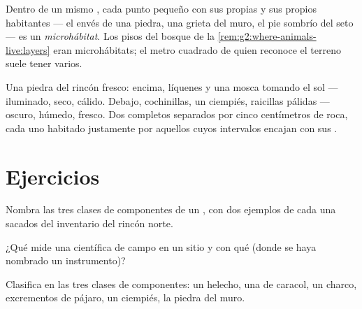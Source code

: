 \begin{definition}[Microhábitat]\label{def:g6:exploring-our-environment:microhabitat}
Dentro de un mismo , cada punto pequeño con sus propias
 y sus propios habitantes --- el envés de una piedra, una
grieta del muro, el pie sombrío del seto --- es un
\emph{microhábitat}. Los pisos del bosque de la
\cref{rem:g2:where-animals-live:layers} eran microhábitats; el metro
cuadrado de quien reconoce el terreno suele tener varios.
\end{definition}

\begin{example}\label{ex:g6:exploring-our-environment:stone}
Una piedra del rincón fresco: encima, líquenes y una mosca tomando el
sol --- iluminado, seco, cálido. Debajo, cochinillas, un ciempiés,
raicillas pálidas --- oscuro, húmedo, fresco. Dos 
completos separados por cinco centímetros de roca, cada uno habitado
justamente por aquellos  cuyos intervalos encajan con sus
.
\end{example}

\section{Ejercicios}

\begin{exercise}[$\star$]\label{exo:g6:exploring-our-environment:1}
Nombra las tres clases de componentes de un , con dos ejemplos
de cada una sacados del inventario del rincón norte.
\end{exercise}

\begin{exercise}[$\star$]\label{exo:g6:exploring-our-environment:2}
¿Qué  mide una científica de campo en un sitio y con qué
(donde se haya nombrado un instrumento)?
\end{exercise}

\begin{exercise}[$\star$]\label{exo:g6:exploring-our-environment:3}
Clasifica en las tres clases de componentes: un helecho, una  de
caracol, un charco, excrementos de pájaro, un ciempiés, la piedra del muro.
\end{exercise}

